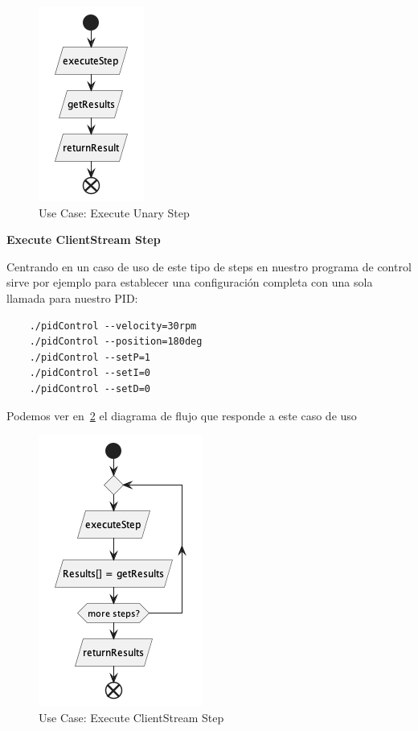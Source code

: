 \begin{figure}[H]
    \centering
    \includegraphics[height=0.2\textheight]{./part/Proyecto_ejecutivo/memoria_descriptiva/descripcionDelProyecto/client/uml/executeUnaryStep}
    \caption{Use Case: Execute Unary Step}\label{fig:Use Case-Execute Unary Step}
\end{figure}

\textbf{Execute ClientStream Step}

Centrando en un caso de uso de este tipo de steps en nuestro programa de control sirve por ejemplo para establecer una configuración completa con una sola llamada para nuestro PID:
\begin{verbatim}
    ./pidControl --velocity=30rpm
    ./pidControl --position=180deg
    ./pidControl --setP=1
    ./pidControl --setI=0
    ./pidControl --setD=0
\end{verbatim}

Podemos ver en~\ref{fig:Use Case-Execute ClientStream Step} el diagrama de flujo que responde a este caso de uso

\begin{figure}[H]
    \centering
    \includegraphics[height=0.2\textheight]{./part/Proyecto_ejecutivo/memoria_descriptiva/descripcionDelProyecto/client/uml/executeClientStreamStep}
    \caption{Use Case: Execute ClientStream Step}\label{fig:Use Case-Execute ClientStream Step}
\end{figure}

